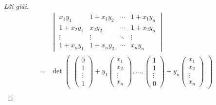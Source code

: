 \begin{proof}[Lời giải]
    \begingroup{}
    \allowdisplaybreaks{}
    \begin{align*}
          & \begin{vmatrix}
                x_{1}y_{1}     & 1 + x_{1}y_{2} & \cdots & 1 + x_{1}y_{n} \\
                1 + x_{2}y_{1} & x_{2}y_{2}     & \cdots & 1 + x_{2}y_{n} \\
                \vdots         & \vdots         & \ddots & \vdots         \\
                1 + x_{n}y_{1} & 1 + x_{n}y_{2} & \cdots & x_{n}y_{n}
            \end{vmatrix}                                                                                     \\
        = &
        \det\begin{pmatrix}
                \begin{pmatrix}
                0      \\
                1      \\
                \vdots \\
                1
            \end{pmatrix}
                +
                y_{1}\begin{pmatrix}
                     x_{1}  \\
                     x_{2}  \\
                     \vdots \\
                     x_{n}
                 \end{pmatrix},
                \ldots,
                \begin{pmatrix}
                1      \\
                1      \\
                \vdots \\
                0
            \end{pmatrix}
                +
                y_{n}\begin{pmatrix}
                     x_{1}  \\
                     x_{2}  \\
                     \vdots \\
                     x_{n}
                 \end{pmatrix}
            \end{pmatrix}                                                                                                              \\

\end{align*}
\end{proof}
